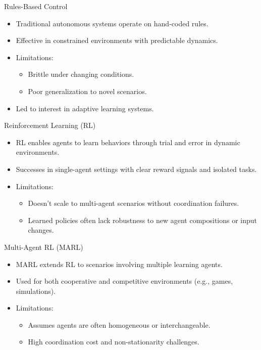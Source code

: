 \documentclass[xcolor={svgnames},aspectratio=169]{beamer}
\begin{document}
\begin{frame}{Rules-Based Control}
    \begin{itemize}
        \item Traditional autonomous systems operate on hand-coded rules.
        \item Effective in constrained environments with predictable dynamics.
        \item Limitations:
        \begin{itemize}
            \item Brittle under changing conditions.
            \item Poor generalization to novel scenarios.
        \end{itemize}
        \item Led to interest in adaptive learning systems.
    \end{itemize}
\end{frame}

\begin{frame}{Reinforcement Learning (RL)}
    \begin{itemize}
        \item RL enables agents to learn behaviors through trial and error in dynamic environments.
        \item Successes in single-agent settings with clear reward signals and isolated tasks.
        \item Limitations:
        \begin{itemize}
            \item Doesn't scale to multi-agent scenarios without coordination failures.
            \item Learned policies often lack robustness to new agent compositions or input changes.
        \end{itemize}
    \end{itemize}
\end{frame}

\begin{frame}{Multi-Agent RL (MARL)}
    \begin{itemize}
        \item MARL extends RL to scenarios involving multiple learning agents.
        \item Used for both cooperative and competitive environments (e.g., games, simulations).
        \item Limitations:
        \begin{itemize}
            \item Assumes agents are often homogeneous or interchangeable.
            \item High coordination cost and non-stationarity challenges.
        \end{itemize}
    \end{itemize}
\end{frame}
\end{document}
